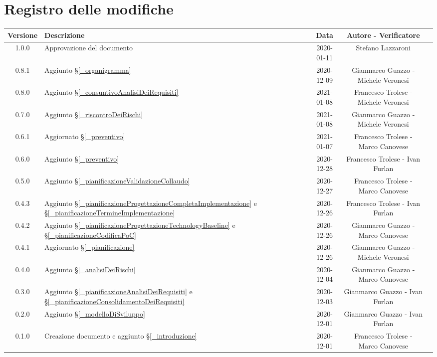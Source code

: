 \section*{Registro delle modifiche}

\begin{center}
	\begin{longtable}{|c|p{5cm}|c|c|c|}
		\hline
		\rowcolor{lighter-grayer}
		\textbf{Versione} & \textbf{Descrizione} & \textbf{Data} & \textbf{Autore - Verificatore} \\
		\hline
		\endfirsthead


		\hline
		1.0.0 & Approvazione del documento & 2020-01-11 & Stefano Lazzaroni \\
		0.8.1 & Aggiunto \S\ref{_organigramma} & 2020-12-09 & Gianmarco Guazzo - Michele Veronesi \\
		0.8.0 & Aggiunto \S\ref{_consuntivoAnalisiDeiRequisiti} & 2021-01-08 & Francesco Trolese - Michele Veronesi \\
		0.7.0 & Aggiunto \S\ref{_riscontroDeiRischi} & 2021-01-08 & Gianmarco Guazzo - Michele Veronesi \\
		0.6.1 & Aggiornato \S\ref{_preventivo} & 2021-01-07 & Francesco Trolese - Marco Canovese \\
		0.6.0 & Aggiunto \S\ref{_preventivo} & 2020-12-28 & Francesco Trolese - Ivan Furlan \\
		0.5.0 & Aggiunto \S\ref{_pianificazioneValidazioneCollaudo} & 2020-12-27 & Francesco Trolese - Marco Canovese \\
		0.4.3 & Aggiunto \S\ref{_pianificazioneProgettazioneCompletaImplementazione} e \S\ref{_pianificazioneTermineImplementazione} & 2020-12-26 & Francesco Trolese - Ivan Furlan \\
		0.4.2 & Aggiunto \S\ref{_pianificazioneProgettazioneTechnologyBaseline} e \S\ref{_pianificazioneCodificaPoC} & 2020-12-26 & Gianmarco Guazzo - Marco Canovese \\
		0.4.1 & Aggiornato \S\ref{_pianificazione} & 2020-12-26 & Gianmarco Guazzo - Michele Veronesi\\
		0.4.0 & Aggiunto \S\ref{_analisiDeiRischi} & 2020-12-04 & Gianmarco Guazzo - Marco Canovese \\
		0.3.0 & Aggiunto \S\ref{_pianificazioneAnalisiDeiRequisiti} e \S\ref{_pianificazioneConsolidamentoDeiRequisiti} & 2020-12-03 & Gianmarco Guazzo - Ivan Furlan \\
		0.2.0 & Aggiunto \S\ref{_modelloDiSviluppo} & 2020-12-01 & Gianmarco Guazzo - Ivan Furlan \\
		0.1.0 & Creazione documento e aggiunto \S\ref{_introduzione} & 2020-12-01 & Francesco Trolese - Marco Canovese \\
		\hline
	\end{longtable}
\end{center}